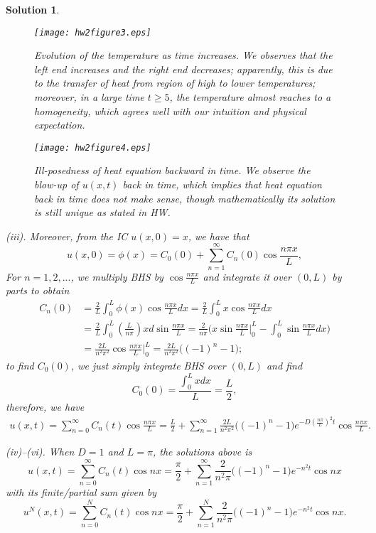 \documentclass[6pt]{article}
\newtheorem{solution}{Solution}
\numberwithin{equation}{section}
\begin{document}
\begin{enumerate}
\begin{solution}
\begin{figure} 
  \centering
  \texttt{[image: hw2figure3.eps]}\\
  \caption{Evolution of the temperature as time increases.  We observes that the left end increases and the right end decreases; apparently, this is due to the transfer of heat from region of high to lower temperatures; moreover, in a large time $t\geq5$, the temperature almost reaches to a homogeneity, which agrees well with our intuition and physical expectation.}\label{figure2}
\end{figure}

\begin{figure} 
  \centering
  \texttt{[image: hw2figure4.eps]}\\
  \caption{Ill-posedness of heat equation backward in time.  We observe the blow-up of $u(x,t)$ back in time, which implies that heat equation back in time does not make sense, though mathematically its solution is still unique as stated in HW.}\label{figure3}
\end{figure}

(iii).  Moreover, from the IC $u(x,0)=x$, we have that
\[u(x,0)=\phi(x)=C_{0}(0)+\sum_{n=1}^{\infty}C_{n}(0)\cos{\frac{n\pi x}{L}},\]
For $n=1,2,...$, we multiply BHS by $\cos \frac{n\pi x}{L}$ and integrate it over $(0,L)$ by parts to obtain
\begin{align*}
C_n(0)&=\frac{2}{L}\int_{0}^{L}\phi(x)\cos{\frac{n\pi x}{L}}dx=\frac{2}{L}\int_{0}^{L}x\cos{\frac{n\pi x}{L}}dx\\
&=\frac{2}{L}\int_{0}^{L}(\frac{L}{n\pi})xd\sin{\frac{n\pi x}{L}}=\frac{2}{n\pi}\Big(x\sin{\frac{n\pi x}{L}}\Big\vert^{L}_{0}-\int_{0}^{L}\sin{\frac{n\pi x}{L}}dx\Big)\\
&=\frac{2L}{n^2\pi^2}\cos{\frac{n\pi x}{L}}\Big\vert_0^L=\frac{2L}{n^2\pi^2}\Big((-1)^n-1\Big);
\end{align*}
to find $C_0(0)$, we just simply integrate BHS over $(0,L)$ and find
\[C_0(0)=\frac{\int_{0}^Lxdx}{L}=\frac{L}{2},\]
therefore, we have
\begin{align*}
u(x,t)=\sum_{n=0}^{\infty}C_{n}(t)\cos{\frac{n\pi x}{L}}=\frac{L}{2}+\sum_{n=1}^{\infty}\frac{2L}{n^2\pi^2}\Big((-1)^n-1\Big)e^{-D(\frac{n\pi}{L})^{2}t}\cos{\frac{n\pi x}{L}}.
\end{align*}

(iv)--(vi).
When $D=1$ and $L=\pi$, the solutions above is
\[u(x,t)=\sum_{n=0}^{\infty}C_{n}(t)\cos nx=\frac{\pi}{2}+\sum_{n=1}^{\infty}\frac{2}{n^2\pi}\Big((-1)^n-1\Big)e^{-n^{2}t}\cos nx\]
with its finite/partial sum given by
\[u^N(x,t)=\sum_{n=0}^NC_{n}(t)\cos nx=\frac{\pi}{2}+\sum_{n=1}^N\frac{2}{n^2\pi}\Big((-1)^n-1\Big)e^{-n^{2}t}\cos nx.\]


\end{solution}
\end{enumerate}
\end{document}
